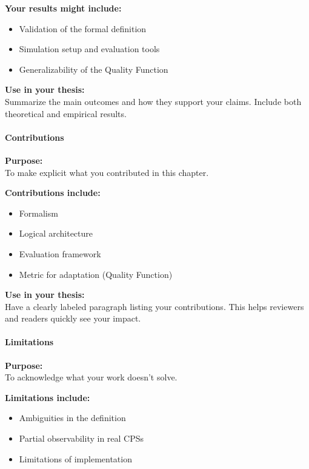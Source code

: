 \vspace{0.5em}
\textbf{Your results might include:}
\begin{itemize}
    \item Validation of the formal definition
    \item Simulation setup and evaluation tools
    \item Generalizability of the Quality Function
\end{itemize}

\vspace{0.5em}
\textbf{Use in your thesis:} \\
Summarize the main outcomes and how they support your claims. Include both theoretical and empirical results.

\paragraph{Contributions}
\textbf{Purpose:} \\
To make explicit what you contributed in this chapter.

\vspace{0.5em}
\textbf{Contributions include:}
\begin{itemize}
    \item Formalism
    \item Logical architecture
    \item Evaluation framework
    \item Metric for adaptation (Quality Function)
\end{itemize}

\vspace{0.5em}
\textbf{Use in your thesis:} \\
Have a clearly labeled paragraph listing your contributions. This helps reviewers and readers quickly see your impact.

\paragraph{Limitations}
\textbf{Purpose:} \\
To acknowledge what your work doesn’t solve.

\vspace{0.5em}
\textbf{Limitations include:}
\begin{itemize}
    \item Ambiguities in the definition
    \item Partial observability in real CPSs
    \item Limitations of implementation
\end{itemize}

